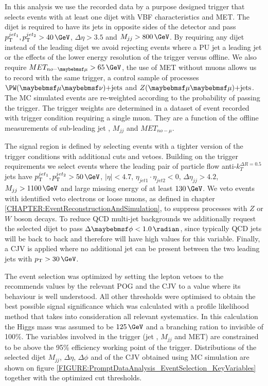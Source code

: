 

In this analysis we use the recorded data by a purpose designed trigger that selects events with at least one dijet with \gls{VBF} characteristics and \gls{MET}. The dijet is required to have its jets in opposite sides of the detector and pass $\pt^{jet_1},\pt^{jet_2} > 40\,\GeV$, $\Delta\eta > 3.5$ and $M_{jj} > 800\,\GeV$. By requiring any dijet instead of the leading dijet we avoid rejecting events where a \gls{PU} jet a leading jet or the effects of the lower energy resolution of the trigger versus offline. We also require $MET_{no-\mu} > 65\,\GeV$, the use of \gls{MET} without muons allows us to record with the same trigger, a control sample of processes  $\PW(\mu\nu)\text{+jets}$ and $\Z(\mu\mu)\text{+jets}$. The \gls{MC} simulated events are re-weighted according to the probability of passing the trigger. The trigger weights are determined in a dataset of event recorded with trigger condition requiring a single muon. They are a function of the offline measurements of sub-leading jet \pt, $M_{jj}$ and $MET_{no-\mu}$.

The signal region is defined by selecting events with a tighter version of the trigger conditions with additional cuts and vetoes. Building on the trigger requirements we select events where the leading pair of particle flow anti-$k_T^{\Delta R=0.5}$ jets have $\pt^{jet_1},\pt^{jet_2} > 50\,\GeV$, $|\eta| < 4.7$, $\eta_{jet1} \cdot \eta_{jet2} < 0$, $\Delta\eta_{jj}>4.2$, $M_{jj}>1100\,\GeV$ and large missing energy of at least $130\,\GeV$. We veto events with identified veto electrons or loose muons, as defined in chapter \ref{CHAPTER:EventReconstructionAndSimulation}, to suppress processes with $Z$ or $W$ boson decays. To reduce \gls{QCD} multi-jet backgrounds we additionally request the selected dijet to pass $\Delta\phi < 1.0\,\radian$, since typically \gls{QCD} jets will be back to back and therefore will have high values for this variable. Finally, a \acrfull{CJV} is applied where no additional jet can be present between the two leading jets with $\pt > 30\,\GeV$.

The event selection was optimized by setting the lepton vetoes to the recommends values by the relevant \gls{POG} and the \gls{CJV} to a value where its behaviour is well understood. All other thresholds were optimised to obtain the best possible signal significance which was calculated with a profile likelihood method that takes into consideration all relevant systematics. In this calculation the Higgs mass was assumed to be $125\,\GeV$ and a branching ration to invisible of 100\%. The variables involved in the trigger (jet \pt, $M_{jj}$ and \gls{MET}) are constrained to be above the 95\% efficiency working point of the trigger. Distributions of the selected dijet $M_{jj}$, $\Delta\eta$, $\Delta\phi$ and of the \gls{CJV} obtained using \gls{MC} simulation are shown on figure \ref{FIGURE:PromptDataAnalysis_EventSelection_KeyVariables} together with the optimized cut thresholds.

